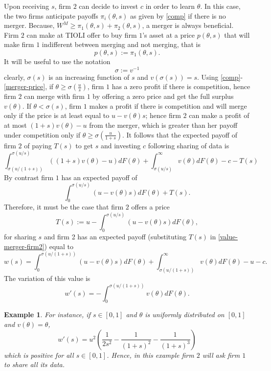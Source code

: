 \documentclass[a4paper,leqno]{article}%
\newtheorem{example}{Example}
\renewcommand{\t}{\theta}
\newcommand{\s}{\sigma}
\begin{document}
Upon receiving $s$, firm $2$ can decide to invest $c$ in order to learn $\t$. In this case, the two firms anticipate payoffs $\pi_i(\t,s)$ as given by \eqref{comp} if there is no merger. Because, $W^M\geq \pi_1(\t,s)+\pi_2(\t,s)$, a merger is always beneficial. Firm $2$ can make at TIOLI offer to buy firm $1$'s asset at a price $p(\t,s)$ that will make firm $1$ indifferent between merging and not merging, that is 
%
\begin{equation}\label{merger-price}
    p(\t,s):=\pi_1(\t,s).  
\end{equation}
%
It will be useful to use the notation
%
\[
\s:=v^{-1}
\]
clearly, $\s(s)$ is an increasing function of $s$ and $v(\s(s))=s$. Using \eqref{comp}-\eqref{merger-price}, if $\t\geq \s(\frac{u}{s})$, firm $1$ has a zero profit if there is competition, hence firm $2$ can merge with firm $1$ by offering a zero price and get the full surplus $v(\t)$. If $\t< \s(s)$, firm $1$ makes a profit if there is competition and will merge only if the price is at least equal to $u-v(\t)s$; hence firm $2$ can make a profit of at most $(1+s)v(\t)-u$ from the merger, which is greater than her payoff under competition only if $\t\geq \s(\frac{u}{1+s})$. It follows that the expected payoff of firm $2$ of paying $T(s)$ to get $s$ and investing $c$ following sharing of data is 
%
\begin{equation}\label{value-merger-firm2}
    \int_{\s(u/(1+s))}^{\s(u/s)} ((1+s)v(\t)-u)dF(\t)+\int_{\s(u/s)}^\infty v(\t)dF(\t)-c-T(s)
\end{equation}
%
By contrast firm $1$ has an expected payoff of 
\begin{equation}\label{value-merger-firm1}
    \int_{0}^{\s(u/s)}(u-v(\t)s)dF(\t)+T(s).
\end{equation}
%
Therefore, it must be the case that firm $2$ offers a price
%
\[
T(s):=u-\int_{0}^{\s(u/s)}(u-v(\t)s)dF(\t),
\]
%
for sharing $s$ and firm 2 has an expected payoff (substituting $T(s)$ in \eqref{value-merger-firm2}) equal to 
%
\[
w(s)=\int_0^{\s(u/(1+s))}(u-v(\t)s)dF(\t)+\int_{\s(u/(1+s))}^\infty v(\t)dF(\t)-u-c.
\]
%
The variation of this value is
%
\[
w'(s)= -\int_0^{\s(u/(1+s))}v(\t)dF(\t).
\]
%
\begin{example}
For instance, if $s\in[0,1]$ and $\t$ is uniformly distributed on $[0,1]$ and $v(\t)=\t$,
%
\[
w'(s)=u^2 \left(\frac{1}{2s^2}-\frac{1}{(1+s)^2}-\frac{1}{(1+s)^3}\right)
\]
%
which is positive for all $s\in[0,1]$. Hence, in this example firm $2$ will ask firm $1$ to share all its data.    
\end{example}
\end{document}
